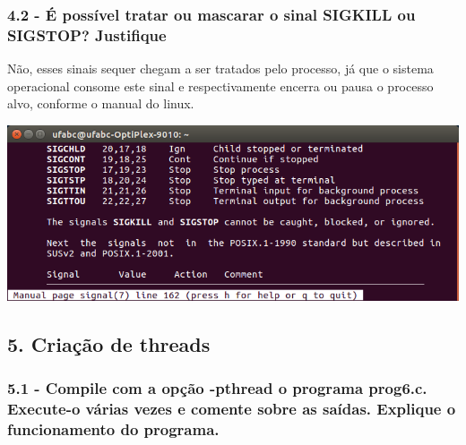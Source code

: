 \subsubsection{4.2 - É possível tratar ou mascarar o sinal SIGKILL ou SIGSTOP? Justiﬁque}

Não, esses sinais sequer chegam a ser tratados pelo processo, já que o sistema operacional consome este sinal e respectivamente encerra ou pausa o processo alvo, conforme o manual do linux.

\vspace{2em}
\begin{minipage}{\textwidth}
    \hspace{-1em}
    \centering
    \includegraphics[trim=0 0 0 0,clip,scale=.4]{pratica1/sigkill.png}
    \label{prog4modpng}
    \hspace{1em}
\end{minipage}

\subsection*{5. Criação de threads}

\subsubsection{5.1 - Compile com a opção -pthread o programa prog6.c. Execute-o várias vezes e comente sobre as saídas. Explique o funcionamento do programa.}

\vspace{-0.5em}
\begin{minipage}{\textwidth}
  \hspace{-1em}
  \centering
  
  \label{prog4mod}
  \hspace{1em}
\end{minipage}
\vspace{0.5em}

